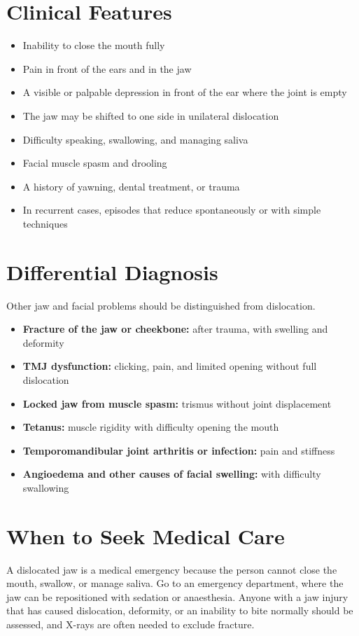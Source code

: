 \section*{Clinical Features}
\begin{itemize}
    \item Inability to close the mouth fully
    \item Pain in front of the ears and in the jaw
    \item A visible or palpable depression in front of the ear where the joint is empty
    \item The jaw may be shifted to one side in unilateral dislocation
    \item Difficulty speaking, swallowing, and managing saliva
    \item Facial muscle spasm and drooling
    \item A history of yawning, dental treatment, or trauma
    \item In recurrent cases, episodes that reduce spontaneously or with simple techniques
\end{itemize}

\section*{Differential Diagnosis}
Other jaw and facial problems should be distinguished from dislocation.
\begin{itemize}
    \item \textbf{Fracture of the jaw or cheekbone:} after trauma, with swelling and deformity
    \item \textbf{TMJ dysfunction:} clicking, pain, and limited opening without full dislocation
    \item \textbf{Locked jaw from muscle spasm:} trismus without joint displacement
    \item \textbf{Tetanus:} muscle rigidity with difficulty opening the mouth
    \item \textbf{Temporomandibular joint arthritis or infection:} pain and stiffness
    \item \textbf{Angioedema and other causes of facial swelling:} with difficulty swallowing
\end{itemize}

\section*{When to Seek Medical Care}
A dislocated jaw is a medical emergency because the person cannot close the mouth, swallow, or manage saliva. Go to an emergency department, where the jaw can be repositioned with sedation or anaesthesia. Anyone with a jaw injury that has caused dislocation, deformity, or an inability to bite normally should be assessed, and X-rays are often needed to exclude fracture.

